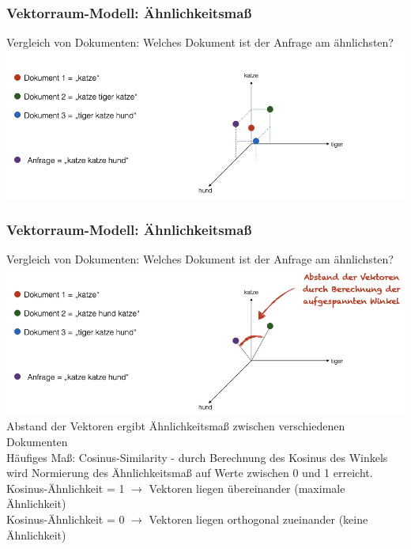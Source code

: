\begin{frame}
    \frametitle{Vektorraum-Modell: Ähnlichkeitsmaß}
    Vergleich von Dokumenten:
    Welches Dokument ist der Anfrage am ähnlichsten?
    \vspace{0.3cm}
    \includegraphics[width=\linewidth]{fig8/vector_space}
    
\end{frame}
    
    
\begin{frame}
\frametitle{Vektorraum-Modell: Ähnlichkeitsmaß}
    Vergleich von Dokumenten:
    Welches Dokument ist der Anfrage am ähnlichsten?
    \vspace{0.3cm}
    \includegraphics[width=\linewidth]{fig8/vector_space_distance}
    \scriptsize{Abstand der Vektoren ergibt Ähnlichkeitsmaß zwischen verschiedenen Dokumenten\\
    Häufiges Maß: Cosinus-Similarity - durch Berechnung des Kosinus des Winkels wird Normierung des Ähnlichkeitsmaß auf Werte zwischen 0 und 1 erreicht.\\
    Kosinus-Ähnlichkeit = 1 $\rightarrow$ Vektoren liegen übereinander (maximale Ähnlichkeit) \\
    Kosinus-Ähnlichkeit = 0  $\rightarrow$ Vektoren liegen orthogonal zueinander (keine Ähnlichkeit) }
    
\end{frame}
    
    
